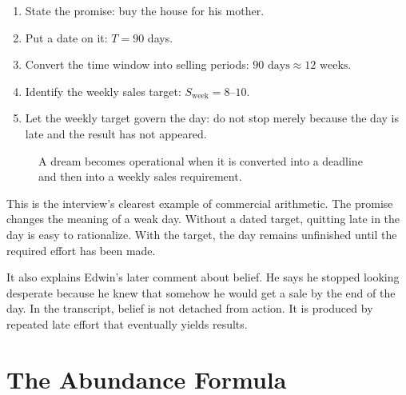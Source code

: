 \begin{enumerate}
\item State the promise: buy the house for his mother.
\item Put a date on it: \(T=90\) days.
\item Convert the time window into selling periods: \(90\text{ days}\approx 12\text{ weeks}\).
\item Identify the weekly sales target: \(S_{\text{week}}=8\text{--}10\).
\item Let the weekly target govern the day: do not stop merely because the day is late and the result has not appeared.
\end{enumerate}

\begin{figure}
\centering
{}
\caption{A dream becomes operational when it is converted into a deadline and then into a weekly sales requirement.}
\end{figure}

This is the interview's clearest example of commercial arithmetic. The promise changes the meaning of a weak day. Without a dated target, quitting late in the day is easy to rationalize. With the target, the day remains unfinished until the required effort has been made.

It also explains Edwin's later comment about belief. He says he stopped looking desperate because he knew that somehow he would get a sale by the end of the day. In the transcript, belief is not detached from action. It is produced by repeated late effort that eventually yields results.

\section{The Abundance Formula}

